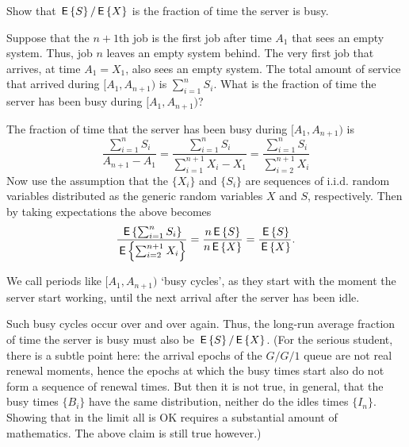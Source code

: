 \begin{exercise}
  Show that $\,\mathsf{E}\left\{S\right\}/\,\mathsf{E}\left\{X\right\}$ is the fraction of time the server is busy.
  \begin{hint}
Suppose that the $n+1$th job is the first job after time $A_1$ that sees an empty system.  Thus, job $n$ leaves an empty system behind. The very first job that arrives,  at time $A_1=X_1$, also sees an empty system. The total amount of service that arrived during $[A_1, A_{n+1})$ is $\sum_{i=1}^n S_i$.
    What is the fraction of time the server has been busy during $[A_1, A_{n+1})$? 
  \end{hint}
  \begin{solution}
 The
    fraction of time that the server has been busy during $[A_1, A_{n+1})$
    is
        \begin{equation*}
\frac{\sum_{i=1}^n S_i}{A_{n+1}-A_1} 
=          \frac{\sum_{i=1}^n S_i}{\sum_{i=1}^{n+1}X_i -X_1} 
=          \frac{\sum_{i=1}^n S_i}{\sum_{i=2}^{n+1}X_i} 
        \end{equation*}
        Now use the assumption that the $\{X_i\}$ and $\{S_i\}$ are
        sequences of i.i.d. random variables distributed as the
        generic random variables $X$ and $S$, respectively. Then by
        taking expectations the above becomes
        \begin{equation*}
\frac{\,\mathsf{E}\left\{\sum_{i=1}^n S_i\right\}}{\,\mathsf{E}\left\{\sum_{i=2}^{n+1}X_i\right\}} 
= \frac{n \,\mathsf{E}\left\{S\right\} }{n \,\mathsf{E}\left\{X\right\}} =
 \frac{ \,\mathsf{E}\left\{S\right\} }{ \,\mathsf{E}\left\{X\right\}}.
        \end{equation*}

We call periods like $[A_1, A_{n+1})$ `busy cycles', as they start with the moment the server start working, until the next arrival after the server has been idle. 

Such  busy cycles occur over and over again. Thus, the
        long-run average fraction of time the server is busy must also
        be $\,\mathsf{E}\left\{S\right\}/\,\mathsf{E}\left\{X\right\}$. (For the serious student, there is a subtle point
        here: the arrival epochs of the $G/G/1$ queue are not real
        renewal moments, hence the epochs at which the busy times
        start also do not form a sequence of renewal times. But then
        it is not true, in general, that the busy times $\{B_i\}$ have
        the same distribution, neither do the idles times
        $\{I_n\}$. Showing that in the limit all is OK requires a
        substantial amount of mathematics. The above claim is still
        true however.)
  \end{solution}
\end{exercise}

